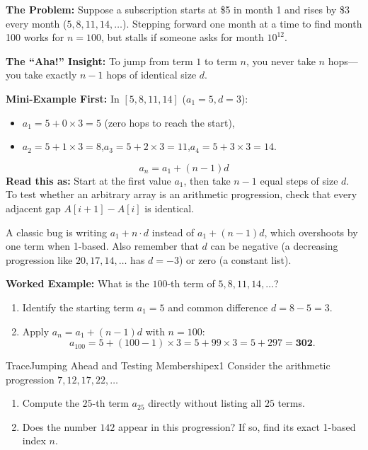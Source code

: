 \documentclass[11pt,a4paper]{article}
\theoremstyle{definition}
\newcommand{\painbeat}{\textbf{\color{accentamber}The Problem:} }
\newcommand{\ahabeat}{\textbf{\color{accentteal}The ``Aha!'' Insight:} }
\newcommand{\examplebeat}{\textbf{\color{primaryblue}Mini-Example First:} }
\begin{document}
\painbeat Suppose a subscription starts at \$5 in month 1 and rises by \$3 every month ($5, 8, 11, 14, \dots$). Stepping forward one month at a time to find month 100 works for $n = 100$, but stalls if someone asks for month $10^{12}$.

\ahabeat To jump from term $1$ to term $n$, you never take $n$ hops---you take exactly $n - 1$ hops of identical size $d$.

\examplebeat In $[5, 8, 11, 14]$ ($a_1 = 5, d = 3$):
\begin{itemize}
    \item $a_1 = 5 + 0 \times 3 = 5$ (zero hops to reach the start),
    \item $a_2 = 5 + 1 \times 3 = 8$,\quad $a_3 = 5 + 2 \times 3 = 11$,\quad $a_4 = 5 + 3 \times 3 = 14$.
\end{itemize}

\begin{formulabox}
\[
    a_n = a_1 + (n - 1)d
\]
\textbf{Read this as:} Start at the first value $a_1$, then take $n - 1$ equal steps of size $d$. To test whether an arbitrary array is an arithmetic progression, check that every adjacent gap $A[i + 1] - A[i]$ is identical.
\end{formulabox}

\begin{watchoutbox}
A classic bug is writing $a_1 + n \cdot d$ instead of $a_1 + (n - 1)d$, which overshoots by one term when 1-based. Also remember that $d$ can be negative (a decreasing progression like $20, 17, 14, \dots$ has $d = -3$) or zero (a constant list).
\end{watchoutbox}

\textbf{Worked Example:} What is the $100$-th term of $5, 8, 11, 14, \dots$?
\begin{enumerate}
    \item Identify the starting term $a_1 = 5$ and common difference $d = 8 - 5 = 3$.
    \item Apply $a_n = a_1 + (n - 1)d$ with $n = 100$:
    \[
        a_{100} = 5 + (100 - 1) \times 3 = 5 + 99 \times 3 = 5 + 297 = \mathbf{302}.
    \]
\end{enumerate}

\begin{tryitbox}{Trace}{Jumping Ahead and Testing Membership}{ex1}
Consider the arithmetic progression $7, 12, 17, 22, \dots$
\begin{enumerate}
    \item Compute the $25$-th term $a_{25}$ directly without listing all $25$ terms.
    \item Does the number $142$ appear in this progression? If so, find its exact 1-based index $n$.
\end{enumerate}
\end{tryitbox}
\end{document}
